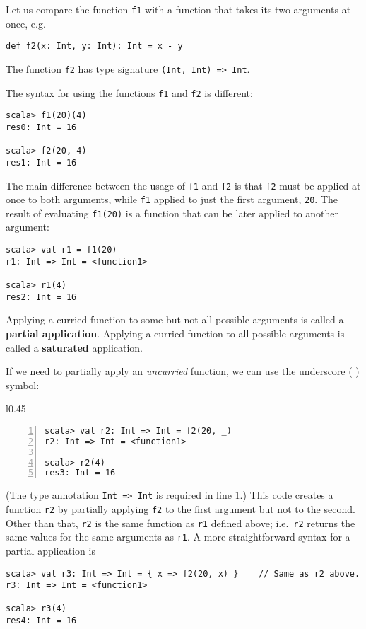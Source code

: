 Let us compare the function \lstinline!f1! with a function that takes
its two arguments at once, e.g.
\begin{lstlisting}
def f2(x: Int, y: Int): Int = x - y
\end{lstlisting}
The function \lstinline!f2! has type signature \lstinline!(Int, Int) => Int!.

The syntax for using the functions \lstinline!f1! and \lstinline!f2!
is different:
\begin{lstlisting}
scala> f1(20)(4)
res0: Int = 16

scala> f2(20, 4)
res1: Int = 16
\end{lstlisting}
The main difference between the usage of \lstinline!f1! and \lstinline!f2!
is that \lstinline!f2! must be applied at once to both arguments,
while \lstinline!f1! applied to just the first argument, \lstinline!20!.
The result of evaluating \lstinline!f1(20)! is a function that can
be later applied to another argument:
\begin{lstlisting}
scala> val r1 = f1(20)
r1: Int => Int = <function1> 

scala> r1(4)
res2: Int = 16
\end{lstlisting}

Applying a curried function to some but not all possible arguments
is called a \textbf{partial application}.
Applying a curried function to all possible arguments is called a
\textbf{saturated} application.

If we need to partially apply an \emph{uncurried} function, we can
use the underscore ($\_$) symbol:

\begin{wrapfigure}{l}{0.45\columnwidth}%
\vspace{-0.85\baselineskip}
\begin{lstlisting}[numbers=left,numberstyle={\small}]
scala> val r2: Int => Int = f2(20, _)
r2: Int => Int = <function1>

scala> r2(4)
res3: Int = 16
\end{lstlisting}
\vspace{-0.95\baselineskip}
\end{wrapfigure}%

\noindent (The type annotation \lstinline!Int => Int! is required
in line 1.) This code creates a function \lstinline!r2! by partially
applying \lstinline!f2! to the first argument but not to the second.
Other than that, \lstinline!r2! is the same function as \lstinline!r1!
defined above; i.e.~\lstinline!r2! returns the same values for the
same arguments as \lstinline!r1!. A more straightforward syntax for
a partial application is
\begin{lstlisting}
scala> val r3: Int => Int = { x => f2(20, x) }    // Same as r2 above.
r3: Int => Int = <function1>

scala> r3(4)
res4: Int = 16
\end{lstlisting}

